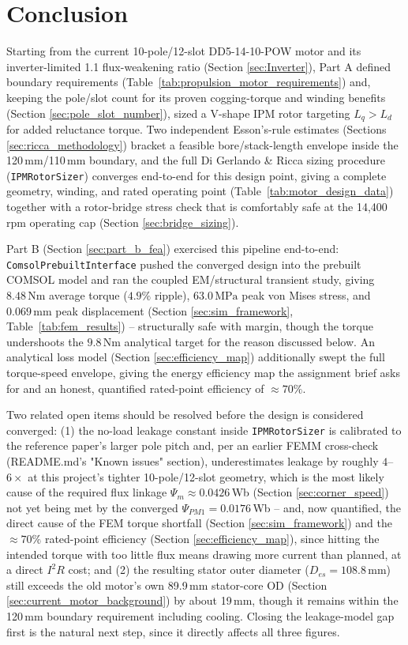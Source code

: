 \documentclass[11pt,a4paper]{article}
\begin{document}
\section{Conclusion}
Starting from the current 10-pole/12-slot DD5-14-10-POW motor and its inverter-limited 1.1 flux-weakening ratio (Section \ref{sec:Inverter}), Part A defined boundary requirements (Table~\ref{tab:propulsion_motor_requirements}) and, keeping the pole/slot count for its proven cogging-torque and winding benefits (Section \ref{sec:pole_slot_number}), sized a V-shape IPM rotor targeting $L_q>L_d$ for added reluctance torque. Two independent Esson's-rule estimates (Sections \ref{sec:ricca_methodology}) bracket a feasible bore/stack-length envelope inside the 120\,mm/110\,mm boundary, and the full Di Gerlando \& Ricca sizing procedure (\texttt{IPMRotorSizer}) converges end-to-end for this design point, giving a complete geometry, winding, and rated operating point (Table~\ref{tab:motor_design_data}) together with a rotor-bridge stress check that is comfortably safe at the 14,400\,rpm operating cap (Section \ref{sec:bridge_sizing}).

Part B (Section \ref{sec:part_b_fea}) exercised this pipeline end-to-end: \texttt{ComsolPrebuiltInterface} pushed the converged design into the prebuilt COMSOL model and ran the coupled EM/structural transient study, giving $8.48\,\text{Nm}$ average torque ($4.9\%$ ripple), $63.0\,\text{MPa}$ peak von Mises stress, and $0.069\,\text{mm}$ peak displacement (Section \ref{sec:sim_framework}, Table~\ref{tab:fem_results}) -- structurally safe with margin, though the torque undershoots the $9.8\,\text{Nm}$ analytical target for the reason discussed below. An analytical loss model (Section \ref{sec:efficiency_map}) additionally swept the full torque-speed envelope, giving the energy efficiency map the assignment brief asks for and an honest, quantified rated-point efficiency of $\approx70\%$.

Two related open items should be resolved before the design is considered converged: (1) the no-load leakage constant inside \texttt{IPMRotorSizer} is calibrated to the reference paper's larger pole pitch and, per an earlier FEMM cross-check (README.md's "Known issues" section), underestimates leakage by roughly $4$--$6\times$ at this project's tighter 10-pole/12-slot geometry, which is the most likely cause of the required flux linkage $\Psi_m\approx0.0426$\,Wb (Section \ref{sec:corner_speed}) not yet being met by the converged $\Psi_{PM1}=0.0176$\,Wb -- and, now quantified, the direct cause of the FEM torque shortfall (Section \ref{sec:sim_framework}) and the $\approx70\%$ rated-point efficiency (Section \ref{sec:efficiency_map}), since hitting the intended torque with too little flux means drawing more current than planned, at a direct $I^2R$ cost; and (2) the resulting stator outer diameter ($D_{es}=108.8\,\text{mm}$) still exceeds the old motor's own 89.9\,mm stator-core OD (Section \ref{sec:current_motor_background}) by about 19\,mm, though it remains within the 120\,mm boundary requirement including cooling. Closing the leakage-model gap first is the natural next step, since it directly affects all three figures.



\end{document}
